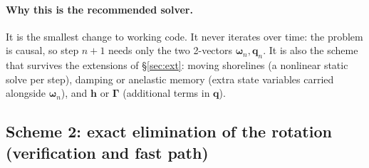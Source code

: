 \documentclass[11pt,a4paper]{article}
\newcommand{\bw}{\bm{\omega}}
\newcommand{\bh}{\mathbf{h}}
\newcommand{\bq}{\mathbf{q}}
\newcommand{\bGam}{\bm{\Gamma}}
\begin{document}
\paragraph{Why this is the recommended solver.} It is the smallest change to working code. It
never iterates over time: the problem is causal, so step $n+1$ needs only the two 2-vectors
$\bw_n,\bq_n$. It is also the scheme that survives the extensions of \S\ref{sec:ext}: moving
shorelines (a nonlinear static solve per step), damping or anelastic memory (extra state variables
carried alongside $\bw_n$), and $\bh$ or $\bGam$ (additional terms in $\bq$).

\subsection{Scheme 2: exact elimination of the rotation (verification and fast path)}
\label{sec:schemeB}
\end{document}
